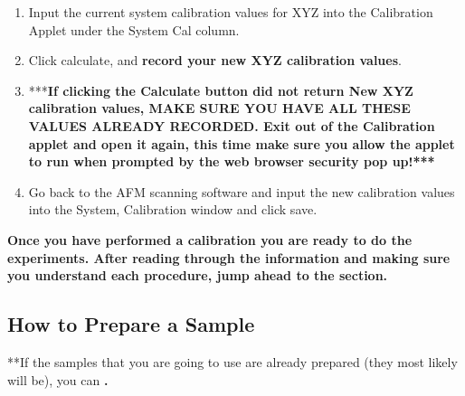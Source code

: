 \documentclass{../lab}
\begin{document}
\begin{enumerate}
\begin{itemize}
    \end{itemize}

    \item Input the current system calibration values for XYZ into the Calibration Applet under the System Cal column.

    \item Click calculate, and \textbf{record your new XYZ calibration values}.

    \item ***\textbf{If clicking the Calculate button did not return New XYZ calibration values, MAKE SURE YOU HAVE ALL THESE VALUES ALREADY RECORDED.  Exit out of the Calibration applet and open it again, this time make sure you allow the applet to run when prompted by the web browser security pop up!***}

    \item Go back to the AFM scanning software and input the new calibration values into the System, Calibration window and click save.

\end{enumerate}

\textbf{Once you have performed a calibration you are ready to do the experiments.  After reading through the information and making sure you understand each procedure, jump ahead to the  section.}

\subsection{How to Prepare a Sample}
**If the samples that you are going to use are already prepared (they most likely will be), you can \textbf{.}
\end{document}
